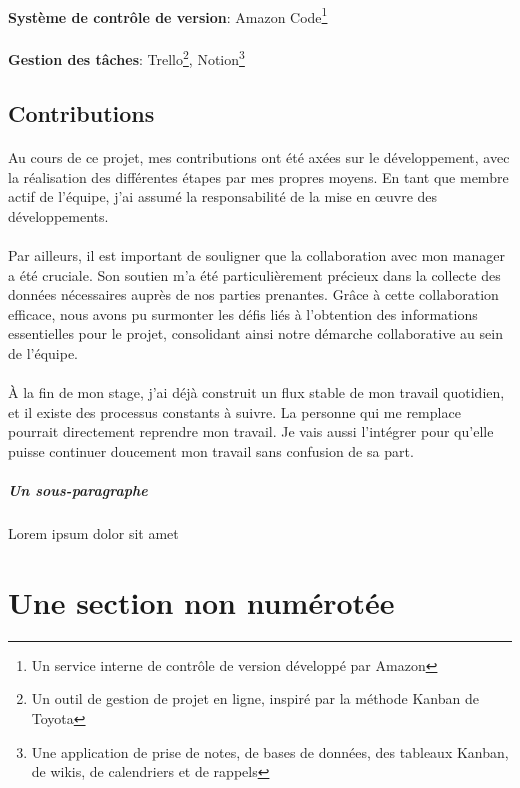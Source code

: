 \paragraph{}
\vspace{-2em}
    \textbf{Système de contrôle de version}: Amazon Code\footnote{Un service interne de contrôle de version développé par Amazon}
\paragraph{}
\vspace{-2em}
    \textbf{Gestion des tâches}: Trello\footnote{Un outil de gestion de projet en ligne, inspiré par la méthode Kanban de
    Toyota}, Notion\footnote{Une application de prise de notes, de bases de données, des tableaux Kanban, de wikis, de calendriers et de rappels}

\subsection{Contributions}
\paragraph{}
\vspace{-2em}
Au cours de ce projet, mes contributions ont été axées sur le développement, avec la réalisation des différentes étapes par mes propres moyens. En tant que membre actif de l'équipe, j'ai assumé la responsabilité de la mise en œuvre des développements. 
\paragraph{}
\vspace{-2em}
Par ailleurs, il est important de souligner que la collaboration avec mon manager a été cruciale. Son soutien m'a été particulièrement précieux dans la collecte des données nécessaires auprès de nos parties prenantes. Grâce à cette collaboration efficace, nous avons pu surmonter les défis liés à l'obtention des informations essentielles pour le projet, consolidant ainsi notre démarche collaborative au sein de l'équipe.
\paragraph{}
\vspace{-2em}
À la fin de mon stage, j'ai déjà construit un flux stable de mon travail quotidien, et il existe des processus constants à suivre. La personne qui me remplace
pourrait directement reprendre mon travail. Je vais aussi l'intégrer pour
qu'elle puisse continuer doucement mon travail sans confusion de sa part.
\subparagraph{Un sous-paragraphe}
Lorem ipsum dolor sit amet
\section*{Une section non numérotée}
